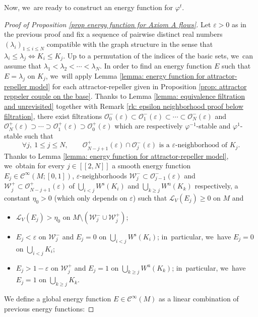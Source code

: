 \documentclass[JEP,XML,SOM,Unicode,NoEqCountersInSection,NoFloatCountersInSection,published]{cedram}
\newcommand{\lcr}{[\![}
\newcommand{\rcr}{]\!]}
\newcommand{\rs}{\mathrm{s}}
\newcommand{\ru}{\mathrm{u}}
\theoremstyle{definition}
\theoremstyle{plain}
\newcommand{\Ccal}{\mathcal{C}}
\newcommand{\Lie}{\mathcal{L}}
\newcommand{\Ocal}{\mathcal{O}}
\newcommand{\Wcal}{\mathcal{W}}
\begin{document}
Now, we~are ready to construct an energy function for $\varphi^t$.

\begin{proof}[Proof of Proposition \ref{prop energy function for Axiom A flows}]
Let $\varepsilon > 0$ as in the previous proof and fix a sequence of pairwise distinct real numbers $(\lambda_i)_{1 \leq i \leq N}$ compatible with the graph structure in the sense that $\lambda_i \leq \lambda_j \Leftrightarrow K_i \leq K_j$. Up to a permutation of the indices of the basic sets, we~can assume that $\lambda_1 < \lambda_2 < \cdots < \lambda_N$.
In order to find an energy function $E$ such that $E = \lambda_j$ on $K_j$, we~will apply Lemma \ref{lemma: energy function for attractor-repeller model} for each attractor-repeller given in Proposition \ref{prop: attractor reppeler couple on the base}. Thanks to Lemma \ref{lemma: equivalence filtration and unrevisited} together with Remark \ref{rk: epsilon neighborhood proof below filtration}, there exist filtrations $\Ocal_0^- (\varepsilon) \subset \Ocal_1^- (\varepsilon) \subset \cdots \subset \Ocal_{N}^- (\varepsilon)$ and $\Ocal_N^+ (\varepsilon) \supset \cdots \supset \Ocal_{1}^+ (\varepsilon) \supset \Ocal_0^+ (\varepsilon)$ which are respectively $\varphi^{-1}$-stable and $\varphi^{1}$-stable such that
\[
\forall j,\ 1 \leq j \leq N, \qquad \Ocal_{N-j+1}^+ (\varepsilon) \cap \Ocal_{j}^- (\varepsilon) \text{ is a } \varepsilon \text{-neighborhood of } K_j.
\]
Thanks to Lemma \ref{lemma: energy function for attractor-repeller model}, we~obtain for every $j\in\lcr2,N\rcr$ a smooth energy function $E_{j} \in \Ccal^{\infty} (M; [0,1])$, $\varepsilon$-neighborhoods $\Wcal_{j}^- \subset \Ocal_{j-1}^- (\varepsilon)$ and $\Wcal_{j}^+ \subset \Ocal_{N-j+1}^+ (\varepsilon)$ of $ \bigcup_{i < j} W^\rs (K_i)$ and $ \bigcup_{k \geq j} W^\ru (K_k)$ respectively, a constant $\eta_0 > 0$ (which only depends on $\varepsilon$) such that $\Lie_V (E_j) \geq 0$ on $M$ and
\begin{itemize}
\item $\Lie_V (E_j) > \eta_0$ on $M\setminus (\Wcal_j^- \cup \Wcal_j^+)$;
\item $E_j < \varepsilon$ on $\Wcal_j^-$ and $E_j = 0$ on $\bigcup_{i < j} W^\rs (K_i)$; in~particular, we~have $E_j = 0$ on $\bigcup_{i < j} K_i$;
\item $E_j > 1 - \varepsilon$ on $\Wcal_j^+$ and $E_j = 1$ on $\bigcup_{k \geq j} W^\ru (K_k)$; in~particular, we~have $E_j = 1$ on $\bigcup_{k \geq j} K_k$.
\end{itemize}
We define a global energy function $E \in \Ccal^{\infty} (M)$ as a linear combination of previous energy functions:

\end{proof}
\end{document}
